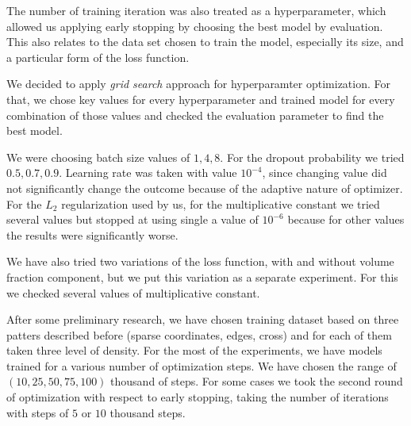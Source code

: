 The number of training iteration was also treated as a hyperparameter, which allowed us applying early stopping by choosing the best model by evaluation.
This also relates to the data set chosen to train the model, especially its size, and a particular form of the loss function. 
\medskip

We decided to apply \emph{grid search} approach for hyperparamter optimization\cite{}.
For that, we chose key values for every hyperparameter and trained model for every combination of those values and checked the evaluation parameter to find the best model.
\medskip

We were choosing batch size values of $1,4,8$.
For the dropout probability we tried $0.5,0.7,0.9$.
Learning rate was taken with value $10^{-4}$, since changing value did not significantly change the outcome because of the adaptive nature of optimizer.
For the $L_2$ regularization used by us, for the multiplicative constant we tried several values but stopped at using single a value of $10^{-6}$ because for other values the results were significantly worse. 

We have also tried two variations of the loss function, with and without volume fraction component, but we put this variation as a separate experiment. 
For this we checked several values of multiplicative constant.
\medskip

After some preliminary research, we have chosen training dataset based on three patters described before (sparse coordinates, edges, cross) and for each of them taken three level of density.
For the most of the experiments, we have models trained for a various number of optimization steps. We have chosen the range of $(10, 25, 50, 75, 100)$ thousand of steps.
For some cases we took the second round of optimization with respect to early stopping, taking the number of iterations with steps of $5$ or $10$ thousand steps.


